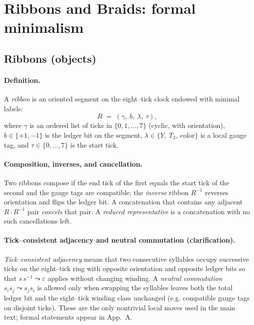 \documentclass[epjc3]{svjour3}
\begin{document}
\begin{center}
\end{center}

\section{Ribbons and Braids: formal minimalism}

\subsection{Ribbons (objects)}
\paragraph{Definition.}
A \emph{ribbon} is an oriented segment on the eight--tick clock endowed with minimal labels:
\[
  R \;=\; (\gamma,\ b,\ \lambda,\ \tau),
\]
where $\gamma$ is an ordered list of ticks in $\{0,1,\dots,7\}$ (cyclic, with orientation), $b\in\{+1,-1\}$ is the ledger bit on the segment, $\lambda\in\{Y,\ T_3,\ \text{color}\}$ is a local gauge tag, and $\tau\in\{0,\dots,7\}$ is the start tick.

\paragraph{Composition, inverses, and cancellation.}
Two ribbons compose if the end tick of the first equals the start tick of the second and the gauge tags are compatible; the \emph{inverse} ribbon $R^{-1}$ reverses orientation and flips the ledger bit. A concatenation that contains any adjacent $R\cdot R^{-1}$ pair \emph{cancels} that pair. A \emph{reduced representative} is a concatenation with no such cancellations left.

\paragraph{Tick--consistent adjacency and neutral commutation (clarification).}
\emph{Tick--consistent adjacency} means that two consecutive syllables occupy successive ticks on the eight--tick ring with opposite orientation and opposite ledger bits so that $s\,s^{-1}\leadsto\varepsilon$ applies without changing winding. A \emph{neutral commutation} $s_is_j\leadsto s_js_i$ is allowed only when swapping the syllables leaves both the total ledger bit and the eight--tick winding class unchanged (e.g. compatible gauge tags on disjoint ticks). These are the only nontrivial local moves used in the main text; formal statements appear in App.~A.
\end{document}
